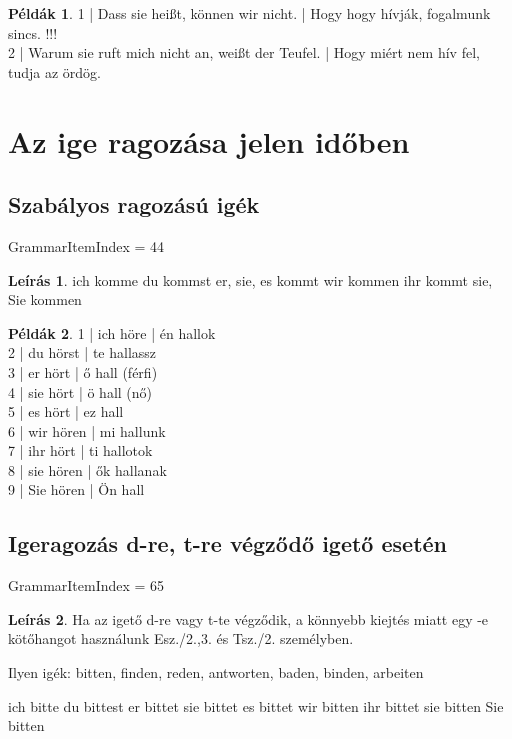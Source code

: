 \documentclass{article}
\theoremstyle{definition}
\newtheorem*{exmp}{Példák}
\newtheorem*{desc}{Leírás}
\begin{document}
\begin{exmp}
1 | Dass sie heißt, können wir nicht. | Hogy hogy hívják, fogalmunk sincs. !!!\\
2 | Warum sie ruft mich nicht an, weißt der Teufel. | Hogy miért nem hív fel, tudja az ördög.\\
\end{exmp}


\section{Az ige ragozása jelen időben}

\subsection{Szabályos ragozású igék}

GrammarItemIndex = 44

\begin{desc}
ich komme
du kommst
er, sie, es kommt
wir kommen
ihr kommt
sie, Sie kommen
\end{desc}

\begin{exmp}
1 | ich höre | én hallok\\
2 | du hörst | te hallassz\\
3 | er hört | ő hall (férfi)\\
4 | sie hört | ö hall (nő)\\
5 | es hört | ez hall\\
6 | wir hören | mi hallunk\\
7 | ihr hört | ti hallotok\\
8 | sie hören | ők hallanak\\
9 | Sie hören | Ön hall\\
\end{exmp}

\subsection{Igeragozás d-re, t-re végződő igető esetén}

GrammarItemIndex = 65

\begin{desc}
Ha az igető d-re vagy t-te végződik, a könnyebb kiejtés miatt egy -e
kötőhangot használunk Esz./2.,3. és Tsz./2. személyben.

Ilyen igék: bitten, finden, reden, antworten, baden, binden, arbeiten

ich bitte
du bittest
er bittet
sie bittet
es bittet
wir bitten
ihr bittet
sie bitten
Sie bitten
\end{desc}
\end{document}
